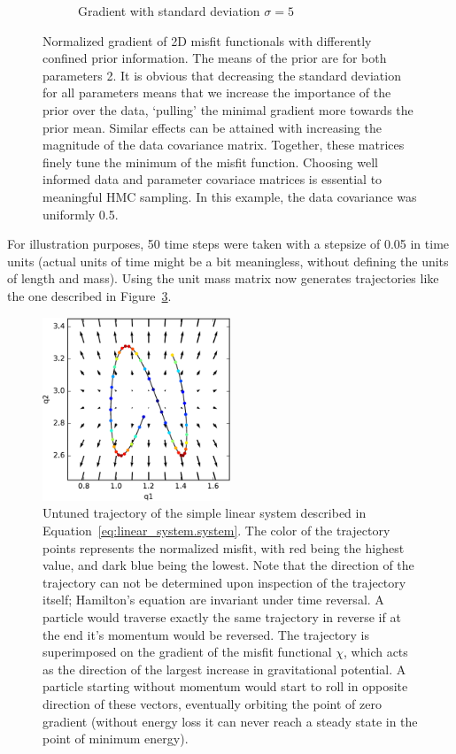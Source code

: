 \begin{figure}
\begin{subfigure}{.5\textwidth}
		\caption{Gradient with standard deviation $\sigma = 5$}
		\label{fig:linear_system.prior_influence.wide}
	\end{subfigure}
	\caption{Normalized gradient of 2D misfit functionals with differently confined prior information. The means of the prior are for both parameters 2. It is obvious that decreasing the standard deviation for all parameters means that we increase the importance of the prior over the data, `pulling' the minimal gradient more towards the prior mean. Similar effects can be attained with increasing the magnitude of the data covariance matrix. Together, these matrices finely tune the minimum of the misfit function. Choosing well informed data and parameter covariace matrices is essential to meaningful \gls{HMC} sampling. In this example, the data covariance was uniformly 0.5.}
	\label{fig:linear_system.prior_influence}
\end{figure}

For illustration purposes, 50 time steps were taken with a stepsize of 0.05 in time units (actual units of time might be a bit meaningless, without defining the units of length and mass). Using the unit mass matrix now generates trajectories like the one described in Figure~\ref{fig:linear_system.trajectory_simple}. 

\begin{figure}
	\centering

	\includegraphics[width=0.5\textwidth]{simple-linear-system/figures/trajectory_simple}

	\caption{Untuned trajectory of the simple linear system described in Equation~\eqref{eq:linear_system.system}. The color of the trajectory points represents the normalized misfit, with red being the highest value, and dark blue being the lowest. Note that the direction of the trajectory can not be determined upon inspection of the trajectory itself; Hamilton's equation are invariant under time reversal. A particle would traverse exactly the same trajectory in reverse if at the end it's momentum would be reversed. The trajectory is superimposed on the gradient of the misfit functional $\chi$, which acts as the direction of the largest increase in gravitational potential. A particle starting without momentum would start to roll in opposite direction of these vectors, eventually orbiting the point of zero gradient (without energy loss it can never reach a steady state in the point of minimum energy).}
	\label{fig:linear_system.trajectory_simple}
\end{figure}	

